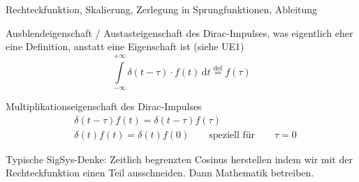 \documentclass[11pt,a4paper,DIV=12]{scrartcl}
\numberwithin{equation}{section}
\numberwithin{figure}{section}
\newcommand\fsd{\mathrm{d}} %
\begin{document}
\begin{Werkzeug}
Rechteckfunktion, Skalierung, Zerlegung in Sprungfunktionen, Ableitung

Ausblendeigenschaft / Austasteigenschaft des Dirac-Impulses,
was eigentlich eher eine Definition, anstatt eine Eigenschaft ist (siehe UE1)
\begin{equation}
\int\limits_{-\infty}^{+\infty} \delta(t-\tau) \cdot f(t) \, \fsd t \stackrel{\mathrm{def}}= f(\tau)
\end{equation}

Multiplikationseigenschaft des Dirac-Impulses
\begin{align}
&\delta(t-\tau) f(t) = \delta(t-\tau) f(\tau)\\
&\delta(t) f(t) = \delta(t) f(0) \qquad \text{speziell für} \qquad \tau=0
\end{align}

\end{Werkzeug}
\begin{Ansatz}
Typische SigSys-Denke: Zeitlich begrenzten Cosinus herstellen indem wir mit der
Rechteckfunktion einen Teil ausschneiden. Dann Mathematik betreiben.
\end{Ansatz}
\end{document}
